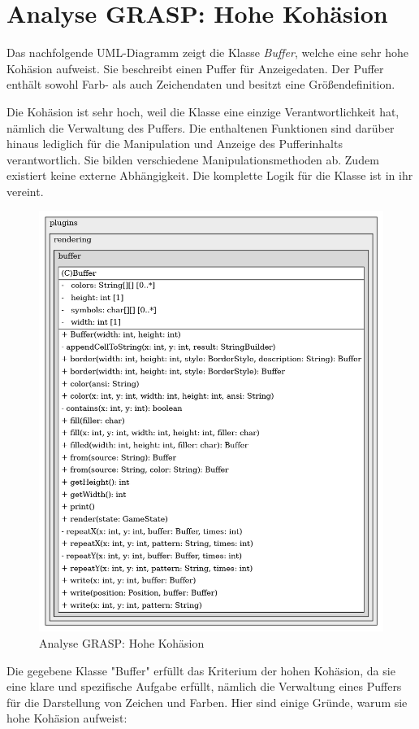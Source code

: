 \fi

\section{Analyse GRASP: Hohe Kohäsion}
Das nachfolgende UML-Diagramm zeigt die Klasse \textit{Buffer}, welche
eine sehr hohe Kohäsion aufweist. Sie beschreibt einen Puffer für
Anzeigedaten. Der Puffer enthält sowohl Farb- als auch Zeichendaten
und besitzt eine Größendefinition.

Die Kohäsion ist sehr hoch, weil die Klasse eine einzige
Verantwortlichkeit hat, nämlich die Verwaltung des Puffers. Die
enthaltenen Funktionen sind darüber hinaus lediglich für die 
Manipulation und Anzeige des Pufferinhalts verantwortlich. Sie bilden
verschiedene Manipulationsmethoden ab. Zudem existiert keine externe
Abhängigkeit. Die komplette Logik für die Klasse ist in ihr vereint.

\vspace{0.5cm}
\begin{figure}[H]
    \centering
    \includegraphics[width=0.75\linewidth]{Bilder/Visualisierung/Buffer_structure.png}
    \caption{Analyse GRASP: Hohe Kohäsion}
\end{figure}

\iffalse
Die gegebene Klasse "Buffer" erfüllt das Kriterium der hohen Kohäsion,
da sie eine klare und spezifische Aufgabe erfüllt, nämlich die
Verwaltung eines Puffers für die Darstellung von Zeichen und Farben.
Hier sind einige Gründe, warum sie hohe Kohäsion aufweist:


